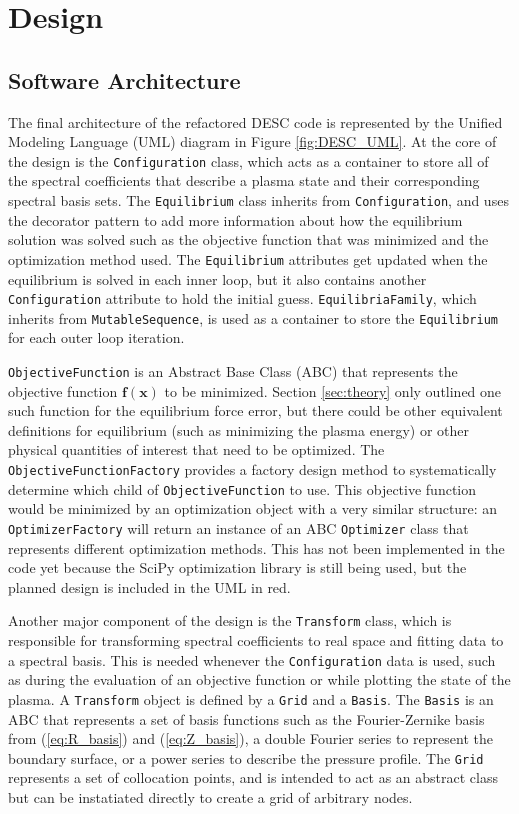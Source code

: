 \documentclass{article}
\begin{document}
\section{Design}

\subsection{Software Architecture}

The final architecture of the refactored DESC code is represented by the Unified Modeling Language (UML) diagram in Figure \ref{fig:DESC_UML}.
At the core of the design is the \texttt{Configuration} class, which acts as a container to store all of the spectral coefficients that describe a plasma state and their corresponding spectral basis sets.
The \texttt{Equilibrium} class inherits from \texttt{Configuration}, and uses the decorator pattern to add more information about how the equilibrium solution was solved such as the objective function that was minimized and the optimization method used.
The \texttt{Equilibrium} attributes get updated when the equilibrium is solved in each inner loop, but it also contains another \texttt{Configuration} attribute to hold the initial guess.
\texttt{EquilibriaFamily}, which inherits from \texttt{MutableSequence}, is used as a container to store the \texttt{Equilibrium} for each outer loop iteration.

\texttt{ObjectiveFunction} is an Abstract Base Class (ABC) that represents the objective function $\mathbf{f}(\mathbf{x})$ to be minimized.
Section \ref{sec:theory} only outlined one such function for the equilibrium force error, but there could be other equivalent definitions for equilibrium (such as minimizing the plasma energy) or other physical quantities of interest that need to be optimized.
The \texttt{ObjectiveFunctionFactory} provides a factory design method to systematically determine which child of \texttt{ObjectiveFunction} to use.
This objective function would be minimized by an optimization object with a very similar structure: an \texttt{OptimizerFactory} will return an instance of an ABC \texttt{Optimizer} class that represents different optimization methods.
This has not been implemented in the code yet because the SciPy optimization library is still being used, but the planned design is included in the UML in red.

Another major component of the design is the \texttt{Transform} class, which is responsible for transforming spectral coefficients to real space and fitting data to a spectral basis.
This is needed whenever the \texttt{Configuration} data is used, such as during the evaluation of an objective function or while plotting the state of the plasma.
A \texttt{Transform} object is defined by a \texttt{Grid} and a \texttt{Basis}.
The \texttt{Basis} is an ABC that represents a set of basis functions such as the Fourier-Zernike basis from (\ref{eq:R_basis}) and (\ref{eq:Z_basis}), a double Fourier series to represent the boundary surface, or a power series to describe the pressure profile.
The \texttt{Grid} represents a set of collocation points, and is intended to act as an abstract class but can be instatiated directly to create a grid of arbitrary nodes.
\end{document}
